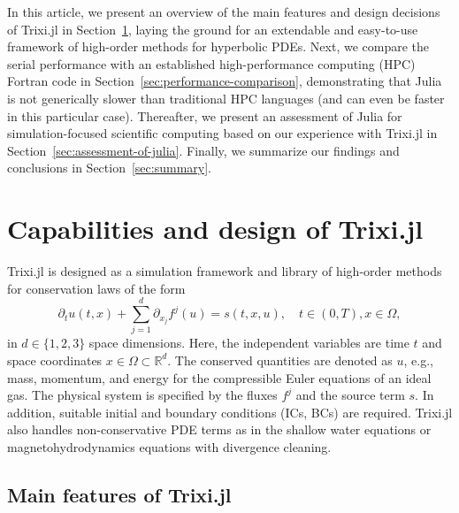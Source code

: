 \documentclass[hidelinks]{juliacon} %
\makeatletter
\newcommand{\eg}[0]{{e.g.\@}\xspace}
\newcommand{\trixi}{Trixi.jl\xspace}
\makeatother
\begin{document}
In this article, we present an overview of the main features and design decisions
of \trixi in Section~\ref{sec:design-of-trixi}, laying the ground for an extendable
and easy-to-use framework of high-order methods for hyperbolic PDEs. Next, we
compare the serial performance with an established high-performance computing (HPC) Fortran code in
Section~\ref{sec:performance-comparison}, demonstrating that Julia is not generically
slower than traditional HPC languages (and can even be faster in this particular case).
Thereafter, we present an assessment of Julia for simulation-focused scientific
computing based on our experience with \trixi in Section~\ref{sec:assessment-of-julia}.
Finally, we summarize our findings and conclusions in Section~\ref{sec:summary}.



\section{Capabilities and design of \trixi}
\label{sec:design-of-trixi}

\trixi is designed as a simulation framework and library of high-order methods for conservation laws
of the form
\begin{equation}
\label{eq:hcl}
  \partial_t u(t, x) + \sum_{j=1}^d \partial_{x_j} f^j(u) = s(t, x, u),
  \quad t \in (0, T), x \in \Omega,
\end{equation}
in $d \in \{1, 2, 3\}$ space dimensions. Here, the independent variables are
time $t$ and space coordinates $x \in \Omega \subset \mathbb{R}^d$. The conserved
quantities are denoted as $u$, \eg, mass, momentum, and energy for the compressible
Euler equations of an ideal gas.
The physical system is specified by the fluxes $f^j$ and the source term $s$.
In addition, suitable initial and boundary conditions (ICs, BCs) are required.
\trixi also handles non-conservative PDE terms as in the shallow water equations or magnetohydrodynamics equations
with divergence cleaning.


\subsection{Main features of \trixi}
\end{document}
